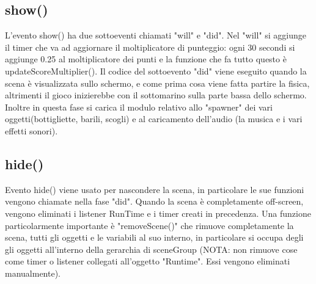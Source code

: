 \documentclass[12pt]{article}
\begin{document}
\subsection{show()}
L'evento show() ha due sottoeventi chiamati "will" e "did". Nel "will" si aggiunge il timer che va ad aggiornare il moltiplicatore 
di punteggio: ogni 30 secondi si aggiunge 0.25 al moltiplicatore dei punti e la funzione che fa tutto questo è updateScoreMultiplier().
 Il codice del sottoevento "did" viene eseguito quando la scena è visualizzata sullo schermo, e come prima cosa viene fatta partire 
 la fisica, altrimenti il gioco inizierebbe con il sottomarino sulla parte bassa dello schermo. Inoltre in questa fase si carica 
 il modulo relativo allo "spawner" dei vari oggetti(bottigliette, barili, scogli) e al caricamento dell'audio (la musica e i vari effetti sonori).

\subsection{hide()}
Evento hide() viene usato per nascondere la scena, in particolare le sue funzioni vengono chiamate nella fase "did". Quando la scena è 
completamente off-screen, vengono eliminati i listener RunTime e i timer creati in precedenza. Una funzione particolarmente importante
 è "removeScene()" che rimuove completamente la scena, tutti gli oggetti e le variabili al suo interno, in particolare si occupa degli 
 gli oggetti all'interno della gerarchia di sceneGroup (NOTA: non rimuove cose come timer o listener collegati all'oggetto "Runtime". 
 Essi vengono eliminati manualmente).
\end{document}
